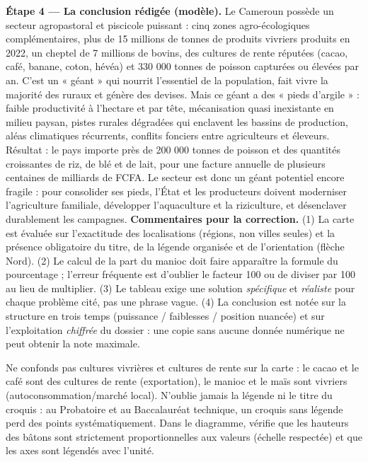 \documentclass[11pt]{article}
\newcommand{\cle}[1]{{\popxbold\color{popdark}#1}}
\begin{document}
\begin{exoresolu}
\textbf{Étape 4 — La conclusion rédigée (modèle).} Le Cameroun possède un secteur agropastoral et piscicole puissant : cinq zones agro-écologiques complémentaires, plus de 15 millions de tonnes de produits vivriers produits en 2022, un cheptel de 7 millions de bovins, des cultures de rente réputées (cacao, café, banane, coton, hévéa) et 330 000 tonnes de poisson capturées ou élevées par an. C'est un « géant » qui nourrit l'essentiel de la population, fait vivre la majorité des ruraux et génère des devises. Mais ce géant a des « pieds d'argile » : faible productivité à l'hectare et par tête, mécanisation quasi inexistante en milieu paysan, pistes rurales dégradées qui enclavent les bassins de production, aléas climatiques récurrents, conflits fonciers entre agriculteurs et éleveurs. Résultat : le pays importe près de 200 000 tonnes de poisson et des quantités croissantes de riz, de blé et de lait, pour une facture annuelle de plusieurs centaines de milliards de FCFA. Le secteur est donc un géant potentiel encore fragile : pour consolider ses pieds, l'État et les producteurs doivent moderniser l'agriculture familiale, développer l'aquaculture et la riziculture, et désenclaver durablement les campagnes.
\tcblower
\textbf{Commentaires pour la correction.} (1) La carte est évaluée sur l'exactitude des localisations (régions, non villes seules) et la présence obligatoire du titre, de la légende organisée et de l'orientation (flèche Nord). (2) Le calcul de la part du manioc doit faire apparaître la formule du pourcentage ; l'erreur fréquente est d'oublier le facteur 100 ou de diviser par 100 au lieu de multiplier. (3) Le tableau exige une solution \emph{spécifique} et \emph{réaliste} pour chaque problème cité, pas une phrase vague. (4) La conclusion est notée sur la structure en trois temps (puissance / faiblesses / position nuancée) et sur l'exploitation \emph{chiffrée} du dossier : une copie sans aucune donnée numérique ne peut obtenir la note maximale.
\end{exoresolu}

\begin{attention}
Ne confonds pas \cle{cultures vivrières} et \cle{cultures de rente} sur la carte : le cacao et le café sont des cultures de rente (exportation), le manioc et le maïs sont vivriers (autoconsommation/marché local). N'oublie jamais la légende ni le titre du croquis : au Probatoire et au Baccalauréat technique, un croquis sans légende perd des points systématiquement. Dans le diagramme, vérifie que les hauteurs des bâtons sont strictement proportionnelles aux valeurs (échelle respectée) et que les axes sont légendés avec l'unité.
\end{attention}
\end{document}

